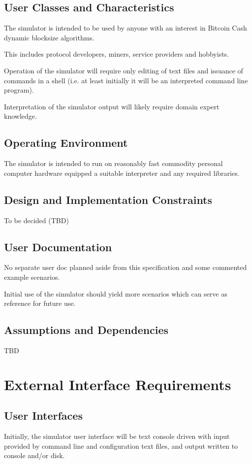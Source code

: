 \documentclass{scrreprt}
\begin{document}
\section{User Classes and Characteristics}
The simulator is intended to be used by anyone with an interest in Bitcoin Cash
dynamic blocksize algorithms.

This includes protocol developers, miners, service providers and hobbyists.

Operation of the simulator will require only editing of text files and issuance of
commands in a shell (i.e. at least initially it will be an interpreted command line
program).

Interpretation of the simulator output will likely require domain expert knowledge.


\section{Operating Environment}
The simulator is intended to run on reasonably fast commodity personal
computer hardware equipped a suitable interpreter and any required libraries.


\section{Design and Implementation Constraints}
To be decided (TBD)


\section{User Documentation}
No separate user doc planned aside from this specification and some commented
example scenarios.

Initial use of the simulator should yield more scenarios which can serve as
reference for future use.


\section{Assumptions and Dependencies}
TBD


\chapter{External Interface Requirements}

\section{User Interfaces}
Initially, the simulator user interface will be text console driven with input
provided by command line and configuration text files, and output written to
console and/or disk.
\end{document}
